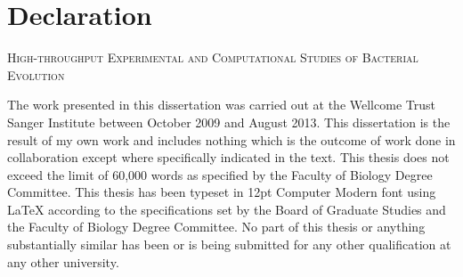 
\chapter{Declaration}

%
\begin{center}
	\textsc{High-throughput Experimental and Computational Studies of Bacterial Evolution}
\end{center}

The work presented in this dissertation was carried out at the Wellcome Trust Sanger Institute between October 2009 and August 2013. This dissertation is the result of my own work and includes nothing which is the outcome of work done in collaboration except where specifically indicated in the text. This thesis does not exceed the limit of 60,000 words as specified by the Faculty of Biology Degree Committee. This thesis has been typeset in 12pt Computer Modern font using \LaTeX{} according to the specifications set by the Board of Graduate Studies and the Faculty of Biology Degree Committee. No part of this thesis or anything substantially similar has been or is being submitted for any other qualification at any other university.
%


